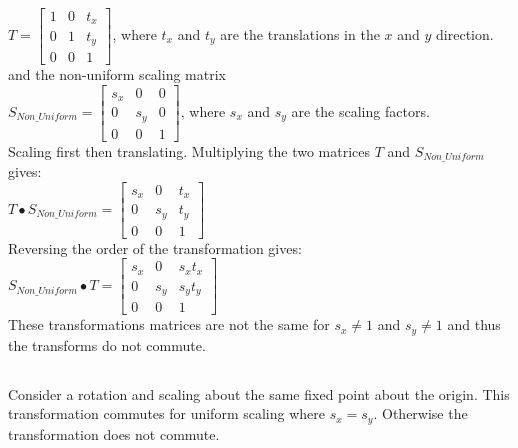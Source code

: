 \documentclass[a4paper,10pt]{scrartcl}
\begin{document}
$T = 
\begin{bmatrix}
    1       & 0 & t_x \\
    0       & 1 & t_y \\
    0       & 0 & 1 
\end{bmatrix}
$, where $t_x $ and $t_y$ are the translations in the $x$ and $y$ direction. \\

and the non-uniform scaling matrix \\

$S_{Non\_Uniform} = \begin{bmatrix}
    s_x       & 0 & 0 \\
    0       & s_y & 0 \\
    0       & 0 & 1     
 \end{bmatrix}
$, where $s_x$ and $s_y$ are the scaling factors. \\

Scaling first then translating. Multiplying the two matrices $T$ and $S_{Non\_Uniform}$ gives: \\

$T \bullet S_{Non\_Uniform} = \begin{bmatrix}
		  s_x & 0 & t_x \\
		  0 & s_y & t_y \\
		  0 & 0 & 1
               \end{bmatrix}
$ \\

Reversing the order of the transformation gives: \\

$S_{Non\_Uniform} \bullet T = \begin{bmatrix}
		  s_x & 0 & s_xt_x \\
		  0 & s_y & s_yt_y \\
		  0 & 0 & 1
               \end{bmatrix}
$ \\ 

These transformations matrices are not the same for $s_x \neq 1$ and $s_y \neq 1$ and thus the transforms do not commute.

\subsection{}

Consider a rotation and scaling about the same fixed point about the origin. This transformation commutes for uniform scaling where $s_x = s_y$. Otherwise the transformation does not commute.\\
\end{document}
